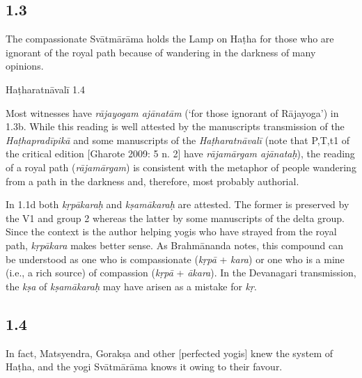 \begin{ekdosis}
\subsection*{1.3}
\begin{translation}[hp01_003]
The compassionate Svātmārāma holds the Lamp on Haṭha for those who are ignorant of the royal path because of wandering in the darkness of many opinions.
\end{translation}

\begin{testimonia}[hp01_003]
Haṭharatnāvalī 1.4

\begin{versinnote}
\end{versinnote}

\end{testimonia}

\begin{philcomm}[hp01_003] 
Most witnesses have \emph{rājayogam ajānatām} (`for those ignorant of Rājayoga') in 1.3b. While this reading is well attested by the manuscripts transmission of the \emph{Haṭhapradīpikā} and some manuscripts of the \emph{Haṭharatnāvalī} (note that P,T,t1 of the critical edition [Gharote 2009: 5 n. 2] have \emph{rājamārgam ajānataḥ}), the reading of a royal path (\emph{rājamārgam}) is consistent with the metaphor of people wandering from a path in the darkness and, therefore, most probably authorial. 

In 1.1d both \emph{kṛpākaraḥ} and \emph{kṣamākaraḥ} are attested. The former is preserved by the V1 and group 2 whereas the latter by some manuscripts of the delta group. Since the context is the author helping yogis who have strayed from the royal path, \emph{kṛpākara} makes better sense. As Brahmānanda notes, this compound can be understood as one who is compassionate (\emph{kṛpā} + \emph{kara}) or one who is a mine (i.e., a rich source) of compassion (\emph{kṛpā} + \emph{ākara}). In the Devanagari transmission, the \emph{kṣa} of \emph{kṣamākaraḥ} may have arisen as a mistake for \emph{kṛ}.       
\end{philcomm}

\subsection*{1.4}
\begin{translation}[hp01_004]
In fact, Matsyendra, Gorakṣa and other [perfected yogis] knew the system of Haṭha, and the yogi Svātmārāma knows it owing to their favour.
\end{translation}


\end{ekdosis}
